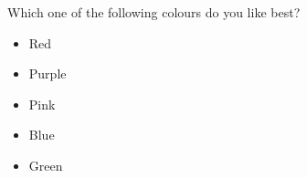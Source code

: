 \begin{tcolorbox}
Which one of the following colours do you like best?

\begin{itemize}
	\setlength\itemsep{-5pt}
	\item Red
	\item Purple
	\item Pink
	\item Blue
	\item Green
\end{itemize}
\end{tcolorbox}
